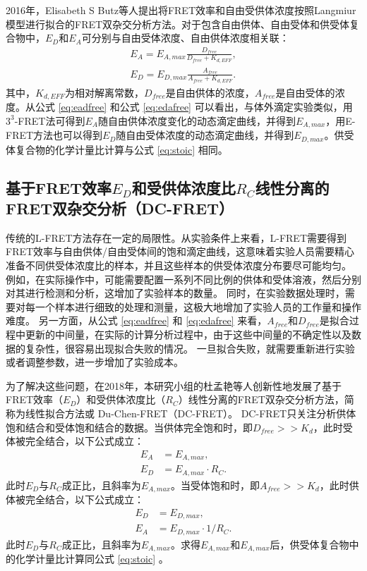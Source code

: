 2016年，Elisabeth S Butz等人提出将FRET效率和自由受供体浓度按照Langmiur模型进行拟合的FRET双杂交分析方法。对于包含自由供体、自由受体和供受体复合物中，$E_D$和$E_A$可分别与自由受体浓度、自由供体浓度相关联：
\begin{align}
    E_A = E_{A,max} \frac{D_{free}}{D_{free}+K_{d,EFF}}, \label{eq:eadfree} \\
    E_D = E_{D,max} \frac{A_{free}}{A_{free}+K_{d,EFF}}. \label{eq:edafree}
\end{align}
其中，$K_{d,EFF}$为相对解离常数，$D_{free}$是自由供体的浓度，$A_{free}$是自由受体的浓度。从公式 \ref{eq:eadfree} 和公式 \ref{eq:edafree} 可以看出，与体外滴定实验类似，用$3^3$-FRET法可得到$E_A$随自由供体浓度变化的动态滴定曲线，并得到$E_{A,max}$，用E-FRET方法也可以得到$E_D$随自由受体浓度的动态滴定曲线，并得到$E_{D,max}$。供受体复合物的化学计量比计算与公式 \ref{eq:stoic} 相同。
\fi

\subsection{\texorpdfstring{基于FRET效率$E_D$和受供体浓度比$R_C$线性分离的FRET双杂交分析（DC-FRET）}{基于FRET效率Ed和受供体浓度比Rc线性分离的FRET双杂交分析（DC-FRET）}}

\ifshowtext
传统的L-FRET方法存在一定的局限性。从实验条件上来看，L-FRET需要得到FRET效率与自由供体/自由受体间的饱和滴定曲线，这意味着实验人员需要精心准备不同供受体浓度比的样本，并且这些样本的供受体浓度分布要尽可能均匀。
例如，在实际操作中，可能需要配置一系列不同比例的供体和受体溶液，然后分别对其进行检测和分析，这增加了实验样本的数量。
同时，在实验数据处理时，需要对每一个样本进行细致的处理和测量，这极大地增加了实验人员的工作量和操作难度。
另一方面，从公式 \ref{eq:eadfree} 和 \ref{eq:edafree} 来看，$A_{free}$和$D_{free}$是拟合过程中更新的中间量，在实际的计算分析过程中，由于这些中间量的不确定性以及数据的复杂性，很容易出现拟合失败的情况。
一旦拟合失败，就需要重新进行实验或者调整参数，进一步增加了实验成本。

为了解决这些问题，在2018年，本研究小组的杜孟艳等人创新性地发展了基于FRET效率（$E_D$）和受供体浓度比（$R_C$）线性分离的FRET双杂交分析方法，简称为线性拟合方法或 Du-Chen-FRET（DC-FRET）。
DC-FRET只关注分析供体饱和结合和受体饱和结合的数据。当供体完全饱和时，即$D_{free}>>K_d$，此时受体被完全结合，以下公式成立：
\begin{align} 
    E_A &= E_{A,max}, \label{eq:ea_appro} \\
    E_D &= {E_{A,max}}{\cdot}{R_C}. \label{eq:ea_slope}
\end{align}
此时$E_D$与$R_C$成正比，且斜率为$E_{A,max}$。当受体饱和时，即$A_{free}>>K_d$，此时供体被完全结合，以下公式成立：
\begin{align}
    E_D &= E_{D,max}, \label{eq:ed_appro} \\
    E_A &= E_{D,max}{\cdot}{1/R_C}. \label{eq:ed_slope}
\end{align}
此时$E_D$与$R_C$成正比，且斜率为$E_{A,max}$。求得$E_{A,max}$和$E_{A,max}$后，供受体复合物中的化学计量比计算同公式 \ref{eq:stoic} 。

